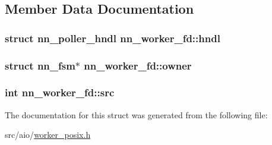 \subsection{Member Data Documentation}
\subsubsection[{hndl}]{\setlength{\rightskip}{0pt plus 5cm}struct {\bf nn\+\_\+poller\+\_\+hndl} nn\+\_\+worker\+\_\+fd\+::hndl}\hypertarget{structnn__worker__fd_a0d0b132d958abe4c94ebbaaf74253cc0}{}\label{structnn__worker__fd_a0d0b132d958abe4c94ebbaaf74253cc0}
\subsubsection[{owner}]{\setlength{\rightskip}{0pt plus 5cm}struct {\bf nn\+\_\+fsm}$\ast$ nn\+\_\+worker\+\_\+fd\+::owner}\hypertarget{structnn__worker__fd_a4f42f80710f93cfc09af3f9845400b06}{}\label{structnn__worker__fd_a4f42f80710f93cfc09af3f9845400b06}
\subsubsection[{src}]{\setlength{\rightskip}{0pt plus 5cm}int nn\+\_\+worker\+\_\+fd\+::src}\hypertarget{structnn__worker__fd_ace0f996d09af6bcb852a389fb54c3f8a}{}\label{structnn__worker__fd_ace0f996d09af6bcb852a389fb54c3f8a}


The documentation for this struct was generated from the following file\+:\begin{DoxyCompactItemize}
\item 
src/aio/\hyperlink{worker__posix_8h}{worker\+\_\+posix.\+h}\end{DoxyCompactItemize}
